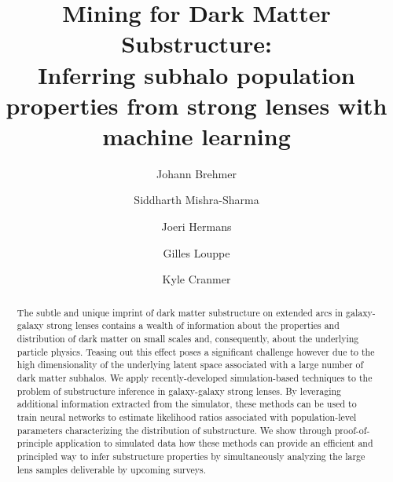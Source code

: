 \documentclass[twocolumn]{aastex62}
\begin{document}
\sloppy\sloppypar\raggedbottom\frenchspacing

\title{\textbf{
Mining for Dark Matter Substructure: \\
Inferring subhalo population properties from strong lenses with machine learning
}}


\author[0000-0003-3344-4209]{Johann Brehmer}

\author[0000-0001-9088-7845]{Siddharth Mishra-Sharma}

\author{Joeri Hermans}

\author[0000-0002-2082-3106]{Gilles Louppe}

\author[0000-0002-5769-7094]{Kyle Cranmer}

\begin{abstract}\noindent
The subtle and unique imprint of dark matter substructure on extended arcs in galaxy-galaxy strong lenses contains a wealth of information about the properties and distribution of dark matter on small scales and, consequently, about the underlying particle physics. Teasing out this effect poses a significant challenge however due to the high dimensionality of the underlying latent space associated with a large number of dark matter subhalos. We apply recently-developed simulation-based techniques to the problem of substructure inference in galaxy-galaxy strong lenses. By leveraging additional information extracted from the simulator, these methods can be used to train neural networks to estimate likelihood ratios associated with population-level parameters characterizing the distribution of substructure. We show through proof-of-principle application to simulated data how these methods can provide an efficient and principled way to infer substructure properties by simultaneously analyzing the large lens samples deliverable by upcoming surveys.
\end{abstract}
\end{document}
